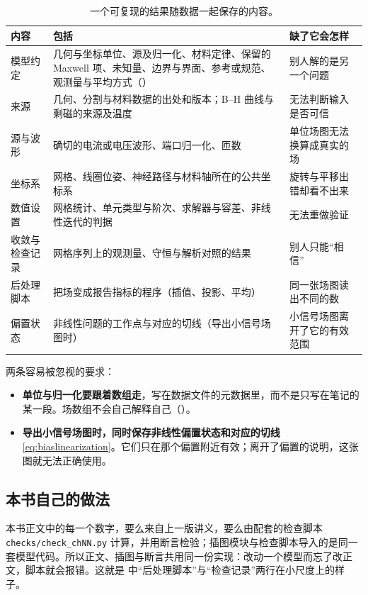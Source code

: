 \begin{table}[H]\centering\small
\caption{一个可复现的结果随数据一起保存的内容。}\label{tab:practice-record}
\begin{tabularx}{\linewidth}{@{}>{\raggedright\arraybackslash}p{.2\linewidth} Y Y@{}}
\toprule
内容 & 包括 & 缺了它会怎样\\\midrule
模型约定 & 几何与坐标单位、源及归一化、材料定律、保留的 Maxwell 项、未知量、边界与界面、参考或规范、观测量与平均方式（） & 别人解的是另一个问题\\
来源 & 几何、分割与材料数据的出处和版本；B--H 曲线与剩磁的来源及温度 & 无法判断输入是否可信\\
源与波形 & 确切的电流或电压波形、端口归一化、匝数 & 单位场图无法换算成真实的场\\
坐标系 & 网格、线圈位姿、神经路径与材料轴所在的公共坐标系 & 旋转与平移出错却看不出来\\
数值设置 & 网格统计、单元类型与阶次、求解器与容差、非线性迭代的判据 & 无法重做验证\\
收敛与检查记录 & 网格序列上的观测量、守恒与解析对照的结果 & 别人只能“相信”\\
后处理脚本 & 把场变成报告指标的程序（插值、投影、平均） & 同一张场图读出不同的数\\
偏置状态 & 非线性问题的工作点与对应的切线（导出小信号场图时） & 小信号场图离开了它的有效范围\\
\bottomrule
\end{tabularx}
\end{table}

两条容易被忽视的要求：
\begin{itemize}
\item \textbf{单位与归一化要跟着数组走}，写在数据文件的元数据里，而不是只写在笔记的某一段。场数组不会自己解释自己（）。
\item \textbf{导出小信号场图时，同时保存非线性偏置状态和对应的切线} \eqref{eq:biaslinearization}。它们只在那个偏置附近有效；离开了偏置的说明，这张图就无法正确使用。
\end{itemize}

\subsection{本书自己的做法}
本书正文中的每一个数字，要么来自上一版讲义，要么由配套的检查脚本 \texttt{checks/check\_chNN.py} 计算，并用断言检验；插图模块与检查脚本导入的是同一套模型代码。所以正文、插图与断言共用同一份实现：改动一个模型而忘了改正文，脚本就会报错。这就是 中“后处理脚本”与“检查记录”两行在小尺度上的样子。

